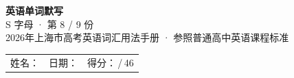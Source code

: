 \documentclass[10pt,a4paper]{article}
\begin{document}
\pagestyle{plain}

\begin{center}
{\LARGE\bfseries 英语单词默写}\\[0.22em]
{\large S 字母 · 第 8 / 9 份}\\[0.18em]
{\small 2026年上海市高考英语词汇用法手册 · 参照普通高中英语课程标准}
\end{center}

\vspace{0.25em}
\noindent\begin{tabular}{@{}p{}@{}p{}@{}p{}@{}}
姓名：\underline{\hspace{2.0cm}} & 日期：\underline{\hspace{2.0cm}} & 得分：\underline{\hspace{1.3cm}}\,/\,46 \\
\end{tabular}

\vspace{0.3em}

\vspace{0.08em}
\end{document}
